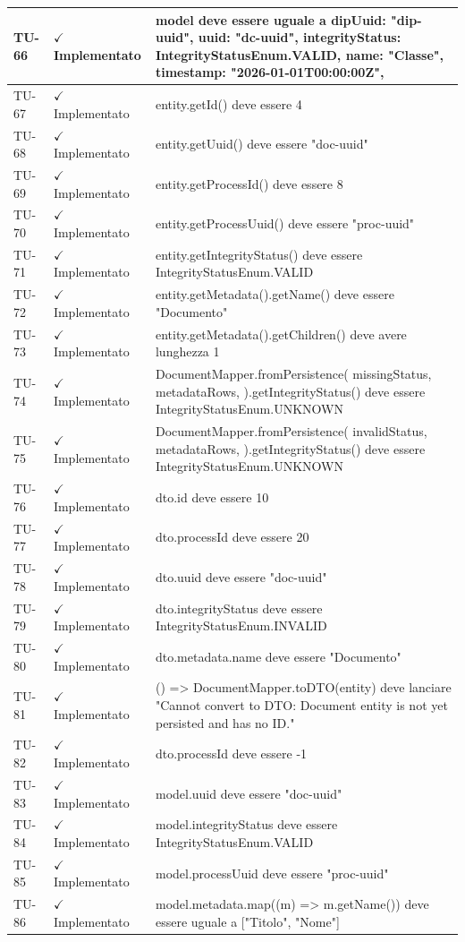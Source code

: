 ﻿\documentclass[a4paper,12pt]{article}
\newcommand{\ok}{\textcolor{green!60!black}{$\checkmark$ Implementato}}
\begin{document}
\begin{longtable}{|p{2cm}|p{3.5cm}|p{9.5cm}|}
\hline
TU-66 & \ok & model deve essere uguale a { dipUuid: "dip-uuid", uuid: "dc-uuid", integrityStatus: IntegrityStatusEnum.VALID, name: "Classe", timestamp: "2026-01-01T00:00:00Z", } \\
\hline
TU-67 & \ok & entity.getId() deve essere 4 \\
\hline
TU-68 & \ok & entity.getUuid() deve essere "doc-uuid" \\
\hline
TU-69 & \ok & entity.getProcessId() deve essere 8 \\
\hline
TU-70 & \ok & entity.getProcessUuid() deve essere "proc-uuid" \\
\hline
TU-71 & \ok & entity.getIntegrityStatus() deve essere IntegrityStatusEnum.VALID \\
\hline
TU-72 & \ok & entity.getMetadata().getName() deve essere "Documento" \\
\hline
TU-73 & \ok & entity.getMetadata().getChildren() deve avere lunghezza 1 \\
\hline
TU-74 & \ok & DocumentMapper.fromPersistence( missingStatus, metadataRows, ).getIntegrityStatus() deve essere IntegrityStatusEnum.UNKNOWN \\
\hline
TU-75 & \ok & DocumentMapper.fromPersistence( invalidStatus, metadataRows, ).getIntegrityStatus() deve essere IntegrityStatusEnum.UNKNOWN \\
\hline
TU-76 & \ok & dto.id deve essere 10 \\
\hline
TU-77 & \ok & dto.processId deve essere 20 \\
\hline
TU-78 & \ok & dto.uuid deve essere "doc-uuid" \\
\hline
TU-79 & \ok & dto.integrityStatus deve essere IntegrityStatusEnum.INVALID \\
\hline
TU-80 & \ok & dto.metadata.name deve essere "Documento" \\
\hline
TU-81 & \ok & () => DocumentMapper.toDTO(entity) deve lanciare "Cannot convert to DTO: Document entity is not yet persisted and has no ID." \\
\hline
TU-82 & \ok & dto.processId deve essere -1 \\
\hline
TU-83 & \ok & model.uuid deve essere "doc-uuid" \\
\hline
TU-84 & \ok & model.integrityStatus deve essere IntegrityStatusEnum.VALID \\
\hline
TU-85 & \ok & model.processUuid deve essere "proc-uuid" \\
\hline
TU-86 & \ok & model.metadata.map((m) => m.getName()) deve essere uguale a ["Titolo", "Nome"] \\

\end{longtable}
\end{document}
